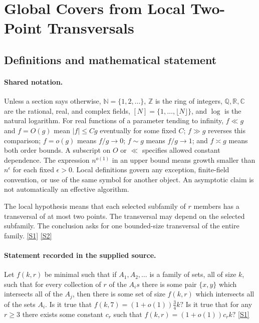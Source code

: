 \documentclass[11pt,a4paper]{article}
\newcommand{\N}{\mathbb{N}}
\newcommand{\Z}{\mathbb{Z}}
\newcommand{\Q}{\mathbb{Q}}
\newcommand{\R}{\mathbb{R}}
\newcommand{\C}{\mathbb{C}}
\newcommand{\sref}[2]{\hyperlink{source:#1:#2}{[S#2]}}
\begin{document}
\section{Global Covers from Local Two-Point Transversals}\label{statement}


\subsection{Definitions and mathematical statement}

\paragraph{Shared notation.}Unless a section says otherwise, $\N=\{1,2,\ldots\}$,
$\Z$ is the ring of integers, $\Q,\R,\C$ are the rational, real, and complex
fields, $[N]=\{1,\ldots,\lfloor N\rfloor\}$, and $\log$ is the natural
logarithm. For real functions of a parameter tending to infinity,
$f\ll g$ and $f=O(g)$ mean $|f|\leq Cg$ eventually for some fixed $C$;
$f\gg g$ reverses this comparison; $f=o(g)$ means $f/g\to0$;
$f\sim g$ means $f/g\to1$; and $f\asymp g$ means both order bounds.
A subscript on $O$ or $\ll$ specifies allowed constant dependence.
The expression $n^{o(1)}$ in an upper bound means growth smaller than
$n^\epsilon$ for each fixed $\epsilon>0$. Local definitions govern any
exception, finite-field convention, or use of the same symbol for another
object. An asymptotic claim is not automatically an effective algorithm.



The local hypothesis means that each selected subfamily of $r$ members has a transversal of at most two points. The transversal may depend on the selected subfamily. The conclusion asks for one bounded-size transversal of the entire family. \sref{statement}{1} \sref{statement}{2}

\paragraph{Statement recorded in the supplied source.}
Let $f(k,r)$ be minimal such that if $A_1,A_2,\ldots$ is a family of sets, all of size $k$, such that for every collection of $r$ of the $A_is$ there is some pair $\{x,y\}$ which intersects all of the $A_j$, then there is some set of size $f(k,r)$ which intersects all of the sets $A_i$. Is it true that $ f(k,7)=(1+o(1))\frac{3}{4}k? $ Is it true that for any $r\geq 3$ there exists some constant $c_r$ such that $ f(k,r)=(1+o(1))c_rk? $ \sref{statement}{1}
\end{document}
